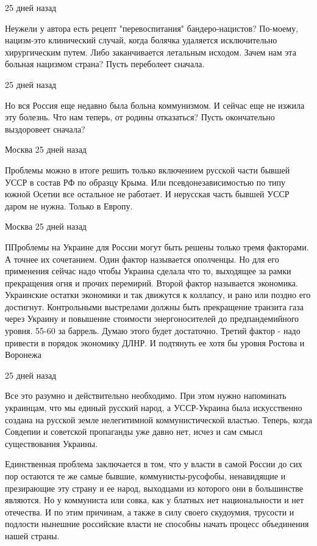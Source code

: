 \begin{itemize}
 25 дней назад  

Неужели у автора есть рецепт "перевоспитания" бандеро-нацистов? По-моему,
нацизм-это клинический случай, когда болячка удаляется исключительно
хирургическим ᴨутем. Либо заканчивается летальным исходом. Зачем нам эта
больная нацизмом страна? Пусть переболеет сначала.

 25 дней назад

Но вся Россия еще недавно была больна коммунизмом. И сейчас еще не изжила эту
болезнь. Что нам теперь, от родины отказаться? Пусть окончательно выздоровеет
сначала?

 Москва 25 дней назад  

Проблемы можно в итоге решить только включением русской части бывшей УССР в состав РФ по образцу Крыма. Или псевдонезависимостью по типу южной Осетии все остальное не работает. И нерусская часть бывшей УССР даром не нужна. Только в Европу.

 Москва 25 дней назад  

ППроблемы на Украине для России могут быть решены только тремя факторами. А
точнее их сочетанием. Один фактор называется ополченцы. Но для его применения
сейчас надо чтобы Украина сделала что то, выходящее за рамки прекращения огня и
прочих перемирий. Второй фактор называется экономика. Украинские остатки
экономики и так движутся к коллапсу, и рано или поздно его достигнут.
Контрольными выстрелами должны быть прекращение транзита газа через Украину и
повышение стоимости энергоносителей до предпандемийного уровня. 55-60 за
баррель. Думаю этого будет достаточно. Третий фактор - надо привести в порядок
экономику ДЛНР. И подтянуть ее хотя бы уровня Ростова и Воронежа

 25 дней назад  

Все это разумно и действительно необходимо. При этом нужно напоминать
украинцам, что мы единый русский народ, а УССР-Украина была искусственно
создана на русской земле нелегитимной коммунистической властью. Теперь, когда
Совдепии и советской пропаганды уже давно нет, исчез и сам смысл существования
Украины.

Единственная проблема заключается в том, что у власти в самой России до сих пор
остаются те же самые бывшие, коммунисты-русофобы, ненавидящие и презирающие эту
страну и ее народ, выходцами из которого они в большинстве являются. Но у
коммуниста или совка, как у блатных нет национальности и нет отечества. И по
этим причинам, а также в силу своего скудоумия, трусости и подлости нынешние
российские власти не способны начать процесс объединения нашей страны.


\end{itemize}
